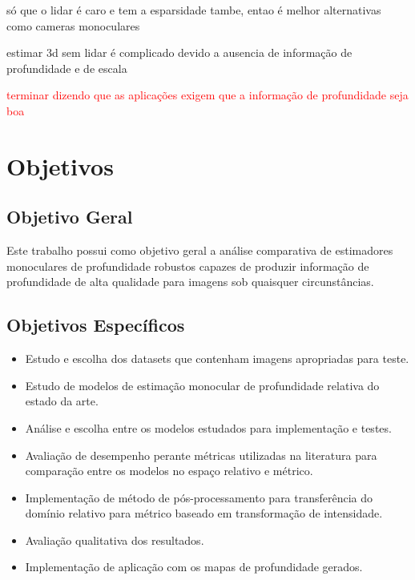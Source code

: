 só que o lidar é caro e tem a esparsidade tambe, entao é melhor alternativas como cameras monoculares

estimar 3d sem lidar é complicado devido a ausencia de informação de profundidade e de escala



\textcolor{red}{terminar dizendo que as aplicações exigem que a informação de profundidade seja boa}
 
\section{Objetivos}


\subsection{Objetivo Geral}
Este trabalho possui como objetivo geral a análise comparativa de estimadores monoculares de profundidade robustos capazes de produzir informação de profundidade de alta qualidade para imagens sob quaisquer circunstâncias.

\subsection{Objetivos Específicos}

\begin{itemize}
    \item Estudo e escolha dos datasets que contenham imagens apropriadas para teste.
    \item Estudo de modelos de estimação monocular de profundidade relativa do estado da arte.
    \item Análise e escolha entre os modelos estudados para implementação e testes.
    \item Avaliação de desempenho perante métricas utilizadas na literatura para comparação entre os modelos no espaço relativo e métrico.
    \item Implementação de método de pós-processamento para transferência do domínio relativo para métrico baseado em transformação de intensidade.
    \item Avaliação qualitativa dos resultados.
    \item Implementação de aplicação com os mapas de profundidade gerados.
    
\end{itemize}

